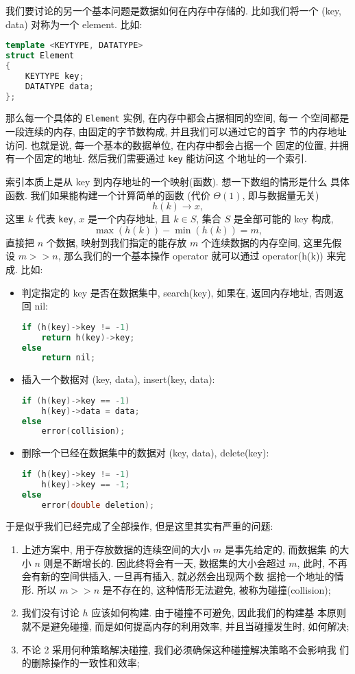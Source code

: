 \documentclass[a4paper]{ctexart}
\theoremstyle{definition}
\theoremstyle{definition}
\begin{document}
我们要讨论的另一个基本问题是数据如何在内存中存储的. 比如我们将一个
(key, data) 对称为一个 element. 比如:

\begin{lstlisting}[language=C++]
template <KEYTYPE, DATATYPE>
struct Element
{
    KEYTYPE key;
    DATATYPE data;
};
\end{lstlisting}

那么每一个具体的 \verb|Element| 实例, 在内存中都会占据相同的空间, 每一
个空间都是一段连续的内存, 由固定的字节数构成, 并且我们可以通过它的首字
节的内存地址访问. 也就是说, 每一个基本的数据单位, 在内存中都会占据一个
固定的位置, 并拥有一个固定的地址. 然后我们需要通过 \verb|key| 能访问这
个地址的一个索引.

索引本质上是从 key 到内存地址的一个映射(函数). 想一下数组的情形是什么
具体函数. 我们如果能构建一个计算简单的函数 (代价 $\Theta(1)$, 即与数据量无关)
$$
h(k) \to x,
$$
这里 $k$ 代表 \verb|key|, $x$ 是一个内存地址, 且 $k \in S$, 集合 $S$
是全部可能的 key 构成,
$$
\max(h(k)) - \min(h(k)) = m,
$$
直接把 $n$ 个数据, 映射到我们指定的能存放 $m$ 个连续数据的内存空间, 这里先假设 $m
>> n$, 那么我们的一个基本操作 operator 就可以通过 operator(h(k)) 来完
成. 比如:
\begin{itemize}

  \item 判定指定的 key 是否在数据集中, search(key), 如果在, 返回内存地址,
     否则返回 nil:

\begin{lstlisting}[language=C++]
if (h(key)->key != -1)
    return h(key)->key;
else
    return nil;
\end{lstlisting}

\item 插入一个数据对 (key, data), insert(key, data):
\begin{lstlisting}[language=C++]
if (h(key)->key == -1)
    h(key)->data = data;
else
    error(collision);
\end{lstlisting}

\item 删除一个已经在数据集中的数据对 (key, data), delete(key):
\begin{lstlisting}[language=C++]
if (h(key)->key != -1)
    h(key)->key == -1;
else
    error(double deletion);
\end{lstlisting}
\end{itemize}

于是似乎我们已经完成了全部操作, 但是这里其实有严重的问题:

\begin{enumerate}
\item 上述方案中, 用于存放数据的连续空间的大小 $m$ 是事先给定的, 而数据集
   的大小 $n$ 则是不断增长的. 因此终将会有一天, 数据集的大小会超过
   $m$, 此时, 不再会有新的空间供插入, 一旦再有插入, 就必然会出现两个数
   据抢一个地址的情形. 所以 $m >> n$ 是不存在的, 这种情形无法避免, 
   被称为碰撞(collision);
\item 我们没有讨论 $h$ 应该如何构建. 由于碰撞不可避免, 因此我们的构建基
    本原则就不是避免碰撞, 而是如何提高内存的利用效率, 并且当碰撞发生时,
    如何解决;
\item 不论 2 采用何种策略解决碰撞, 我们必须确保这种碰撞解决策略不会影响我
   们的删除操作的一致性和效率;
\end{enumerate}
\end{document}
